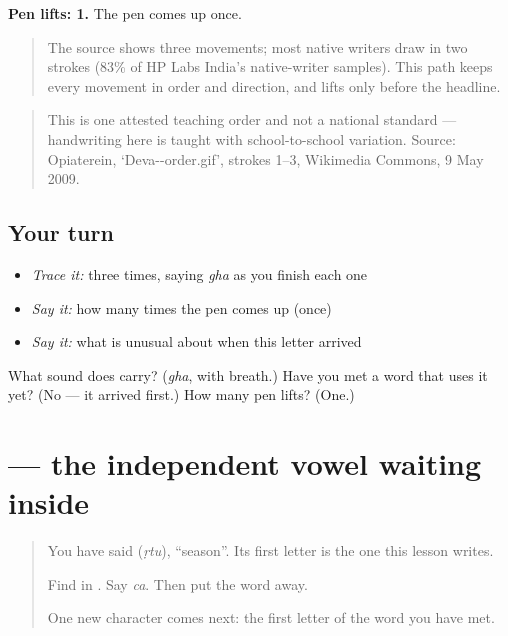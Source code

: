 \textbf{Pen lifts: 1.} The pen comes up once.

\begin{quote}
The source shows three movements; most native writers draw  in two strokes (83\% of HP Labs India's native-writer samples). This path keeps every movement in order and direction, and lifts only before the headline.
\end{quote}

\begin{quote}
This is one attested teaching order and not a national standard — handwriting here is taught with school-to-school variation. Source: Opiaterein, ‘Deva--order.gif’, strokes 1–3, Wikimedia Commons, 9 May 2009.
\end{quote}

\subsection*{Your turn}
\begin{itemize}
\raggedright
  \item \emph{Trace it:}  three times, saying \emph{gha} as you finish each one
  \item \emph{Say it:} how many times the pen comes up (once)
  \item \emph{Say it:} what is unusual about when this letter arrived
\end{itemize}

\begin{tcolorbox}[breakable,colback=teal!4,colframe=teal!35!black,title={Before you move on}]
What sound does \textbf{} carry? (\emph{gha}, with breath.) Have you met a word that uses it yet? (No — it arrived first.) How many pen lifts? (One.)
\end{tcolorbox}
\section[\texorpdfstring{\hi{ऋ} (ṛ (Hindi ri))}{ऋ (ṛ (Hindi ri))}]{ — the independent vowel waiting inside }

\label{lesson:HI-S125-letter-vocalic-r}



\begin{quote}
You have said \textbf{} (\emph{ṛtu}), \textquotedblleft{}season\textquotedblright{}. Its first letter is the one this lesson writes.

Find \textbf{} in \textbf{}. Say \emph{ca}. Then put the word away.

One new character comes next: the first letter of the word you have met.
\end{quote}

